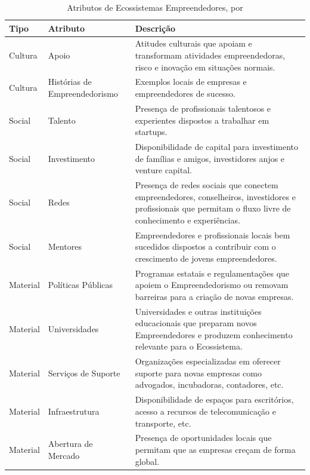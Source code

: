 \begin{table}[!htb]
	\centering
	\begin{tabular}{ | p{3cm} | p{4cm} | p{8cm} | }
		\hline
		Tipo & Atributo & Descrição \\ \hline
		Cultura & Apoio & Atitudes culturais que apoiam e transformam atividades empreendedoras, risco e inovação em situações normais. \\ \hline
		Cultura & Histórias de Empreendedorismo & Exemplos locais de empresas e empreendedores de sucesso. \\ \hline
		Social & Talento & Presença de profissionais talentosos e experientes dispostos a trabalhar em startups. \\ \hline
		Social & Investimento & Disponibilidade de capital para investimento de famílias e amigos, investidores anjos e venture capital. \\ \hline
		Social & Redes & Presença de redes sociais que conectem empreendedores, conselheiros, investidores e profissionais que permitam o fluxo livre de conhecimento e experiências. \\ \hline
		Social & Mentores & Empreendedores e profissionais locais bem sucedidos dispostos a contribuir com o crescimento de jovens empreendedores. \\ \hline
		Material & Políticas Públicas & Programas estatais e regulamentações que apoiem o Empreendedorismo ou removam barreiras para a criação de novas empresas. \\ \hline
		Material & Universidades & Universidades e outras instituições educacionais que preparam novos Empreendedores e produzem conhecimento relevante para o Ecossistema. \\ \hline
		Material & Serviços de Suporte & Organizações especializadas em oferecer suporte para novas empresas como advogados, incubadoras, contadores, etc. \\ \hline
		Material & Infraestrutura & Disponibilidade de espaços para escritórios, acesso a recursos de telecomunicação e transporte, etc. \\ \hline
		Material & Abertura de Mercado & Presença de oportunidades locais que permitam que as empresas creçam de forma global. \\ \hline
	\end{tabular}
	\caption{Atributos de Ecossistemas Empreendedores, por \cite{Spigel2015}}
	\label{table:attributes_of_entrepreneurship_ecosystems}
\end{table}

